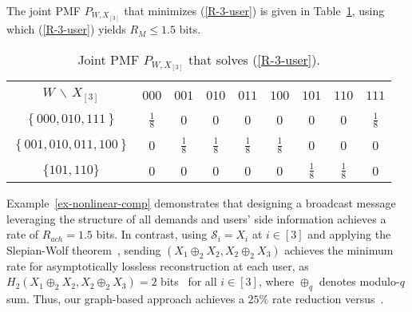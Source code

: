 \documentclass[conference, letterpaper]{IEEEtran} %
\begin{document}
\begin{ex}
The joint PMF $P_{W, X_{[3]}}$ that minimizes (\ref{R-3-user}) is given in Table~\ref{tab:optimal-joint-distribution}, using which (\ref{R-3-user}) yields $R_{M}\leq1.5$ bits.
\begin{table}[h!]
\setlength{\tabcolsep}{2pt}
    \begin{center}
          \begin{tabular}
          {|c|c|c|c|c|c|c|c|c|}
            \hline&&&&&&&&\\[-1.2em]
            $W\,\backslash\, X_{[3]}$&$000$&$001$&$010$&$011$&$100$&$101$&$110$&$111$\\
             \hline &&&&&&&&\\[-1.em]
             $\left\{
                 000,010,111 \right\}$&$\frac{1}{8}$&$0$&$0$&$0$&$0$&$0$&$0$&$\frac{1}{8}$\\[0.1em]
             \hline&&&&&&&&\\[-1.1em]
             $\left\{
                  001,010,011,100
             \right\}$&$0$&$\frac{1}{8}$&$\frac{1}{8}$&$\frac{1}{8}$&$\frac{1}{8}$&$0$&$0$&$0$  \\[0.2em]
             \hline&&&&&&&&\\[-1.1em]
             $\{101,110\}$&$0$&$0$&$0$&$0$&$0$&$\frac{1}{8}$&$\frac{1}{8}$&$0$\\[0.1em]
             \hline
        \end{tabular}
        \end{center}
\caption{ Joint PMF $P_{W,X_{[3]}}$ that solves (\ref{R-3-user}).}
\label{tab:optimal-joint-distribution}
\end{table}
\end{ex}




Example~\ref{ex-nonlinear-comp} demonstrates that designing a broadcast message leveraging the structure of all demands and users' side information achieves a rate of $R_{ach}=1.5$ bits. In contrast, using $\mathcal{S}_i = X_i$ at $i\in[3]$ and applying the Slepian-Wolf theorem~\cite{SlepWolf1973}, sending $(X_1\oplus_2 X_2, X_2\oplus_2 X_3)$ achieves the minimum rate for asymptotically lossless reconstruction at each user, as $H_2(X_1\oplus_2 X_2, X_2\oplus_2 X_3)=2$ bits~\cite{SlepWolf1973} for all $i\in[3]$, where $\oplus_q$ denotes modulo-$q$ sum. Thus, our graph-based approach achieves a $25\%$ rate reduction versus~\cite{SlepWolf1973}.
\end{document}
